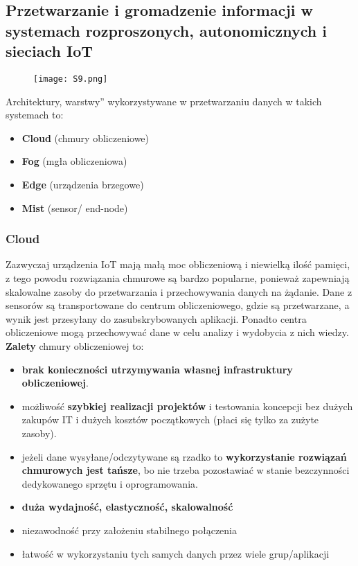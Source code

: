 \subsection{Przetwarzanie i gromadzenie informacji w systemach rozproszonych, autonomicznych i sieciach IoT}

\begin{figure}[H]
	\centering
	\texttt{[image: S9.png]}
\end{figure}

Architektury, warstwy” wykorzystywane w przetwarzaniu danych w takich systemach to:

\begin{itemize}
	\item \textbf{Cloud} (chmury obliczeniowe)
	\item \textbf{Fog} (mgła obliczeniowa)
	\item \textbf{Edge} (urządzenia brzegowe)
	\item \textbf{Mist} (sensor/ end-node)
\end{itemize}

\subsubsection{Cloud}

Zazwyczaj urządzenia IoT mają małą moc obliczeniową i niewielką ilość pamięci, z tego powodu rozwiązania chmurowe są bardzo popularne, ponieważ zapewniają skalowalne zasoby do przetwarzania i przechowywania danych na żądanie. Dane z sensorów są transportowane do centrum obliczeniowego, gdzie są przetwarzane, a wynik jest przesyłany do zasubskrybowanych aplikacji. Ponadto centra obliczeniowe mogą przechowywać dane w celu analizy i wydobycia z nich wiedzy. \\

\textbf{Zalety} chmury obliczeniowej to:

\begin{itemize}
	\item \textbf{brak konieczności utrzymywania własnej infrastruktury obliczeniowej}.
	\item możliwość \textbf{szybkiej realizacji projektów} i testowania koncepcji bez dużych zakupów IT i dużych kosztów początkowych (płaci się tylko za zużyte zasoby).
	\item jeżeli dane wysyłane/odczytywane są rzadko to \textbf{wykorzystanie rozwiązań chmurowych jest tańsze}, bo nie trzeba pozostawiać w stanie bezczynności dedykowanego sprzętu i oprogramowania.
	\item \textbf{duża wydajność, elastyczność, skalowalność}
	\item niezawodność przy założeniu stabilnego połączenia
	\item łatwość w wykorzystaniu tych samych danych przez wiele grup/aplikacji \\
\end{itemize}

